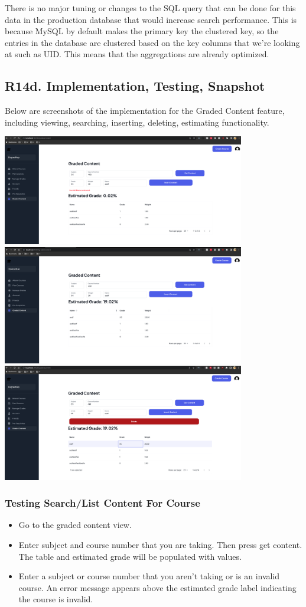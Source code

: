 \documentclass[12pt, a4paper]{article}
\begin{document}
There is no major tuning or changes to the SQL query that can be done for this data in the production database that would increase search performance. This is because MySQL by default makes the primary key the clustered key, so the entries in the database are clustered based on the key columns that we're looking at such as UID. This means that the aggregations are already optimized.
\subsection*{R14d. Implementation, Testing, Snapshot}
Below are screenshots of the implementation for the Graded Content feature, including viewing, searching, inserting, deleting, estimating functionality.
\begin{center}
    \includegraphics[width=400px]{images/R14/i1}
    \includegraphics[width=400px]{images/R14/i2}
    \includegraphics[width=400px]{images/R14/i3}
\end{center}
\subsubsection*{Testing Search/List Content For Course}
\begin{itemize}
    \item Go to the graded content view.
    \item Enter subject and course number that you are taking. Then press get content. The table and estimated grade will be populated with values.
    \item Enter a subject or course number that you aren't taking or is an invalid course. An error message appears above the estimated grade label indicating the course is invalid.
\end{itemize}
\end{document}
